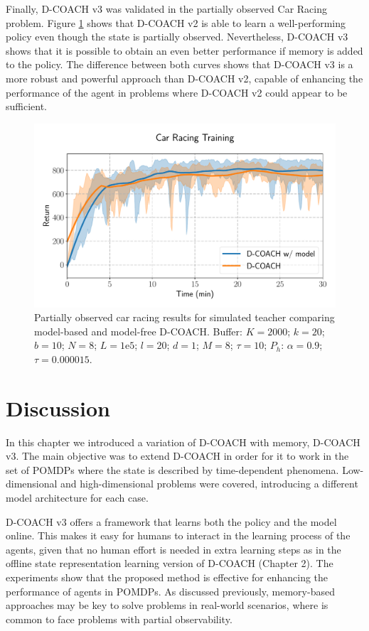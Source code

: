Finally, D-COACH v3 was validated in the partially observed Car Racing problem. Figure \ref{fig:po_cr} shows that D-COACH v2 is able to learn a well-performing policy even though the state is partially observed. Nevertheless, D-COACH v3 shows that it is possible to obtain an even better performance if memory is added to the policy. The difference between both curves shows that D-COACH v3 is a more robust and powerful approach than D-COACH v2, capable of enhancing the performance of the agent in problems where D-COACH v2 could appear to be sufficient.

\begin{figure}[h]
    \centering
    \includegraphics[width=0.9\linewidth]{imagenes/cap3/car_racing_lstm.pdf}
    \caption{Partially observed car racing results for simulated teacher comparing model-based and model-free D-COACH.  Buffer: $K = 2000$; $k=20$; $b=10$; $N = 8$; $L=1\mathrm{e}5$; $l=20$; $d=1$; $M=8$; $\tau=10$; $P_{h}$: $\alpha = 0.9$; $\tau = 0.000015$.}
    \label{fig:po_cr}
\end{figure}

\section{Discussion}
In this chapter we introduced a variation of D-COACH with memory, D-COACH v3. The main objective was to extend D-COACH in order for it to work in the set of POMDPs where the state is described by time-dependent phenomena. Low-dimensional and high-dimensional problems were covered, introducing a different model architecture for each case. 

D-COACH v3 offers a framework that learns both the policy and the model online. This makes it easy for humans to interact in the learning process of the agents, given that no human effort is needed in extra learning steps as in the offline state representation learning version of D-COACH (Chapter 2). The experiments show that the proposed method is effective for enhancing the performance of agents in POMDPs. As discussed previously, memory-based approaches may be key to solve problems in real-world scenarios, where is common to face problems with partial observability. 

